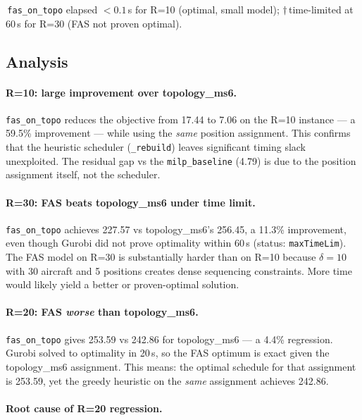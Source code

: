 \noindent *\,\texttt{fas\_on\_topo} elapsed $<0.1$\,s for R=10 (optimal, small model);
$\dagger$\,time-limited at 60\,s for R=30 (FAS not proven optimal).

\subsection{Analysis}
\label{exp:exp03-analysis}

\paragraph{R=10: large improvement over topology\_ms6.}

\texttt{fas\_on\_topo} reduces the objective from 17.44 to 7.06 on the R=10
instance — a 59.5\% improvement — while using the \emph{same} position
assignment.  This confirms that the heuristic scheduler (\texttt{\_rebuild})
leaves significant timing slack unexploited.  The residual gap vs the
\texttt{milp\_baseline} (4.79) is due to the position assignment itself,
not the scheduler.

\paragraph{R=30: FAS beats topology\_ms6 under time limit.}

\texttt{fas\_on\_topo} achieves 227.57 vs topology\_ms6's 256.45, a 11.3\%
improvement, even though Gurobi did not prove optimality within 60\,s
(status: \texttt{maxTimeLim}).  The FAS model on R=30 is substantially
harder than on R=10 because $\delta=10$ with 30 aircraft and 5 positions
creates dense sequencing constraints.  More time would likely yield a
better or proven-optimal solution.

\paragraph{R=20: FAS \emph{worse} than topology\_ms6.}

\texttt{fas\_on\_topo} gives 253.59 vs 242.86 for topology\_ms6 — a 4.4\%
regression.  Gurobi solved to optimality in 20\,s, so the FAS optimum
is exact given the topology\_ms6 assignment.  This means: the optimal
schedule for that assignment is 253.59, yet the greedy heuristic on the
\emph{same} assignment achieves 242.86.

\paragraph{Root cause of R=20 regression.}

